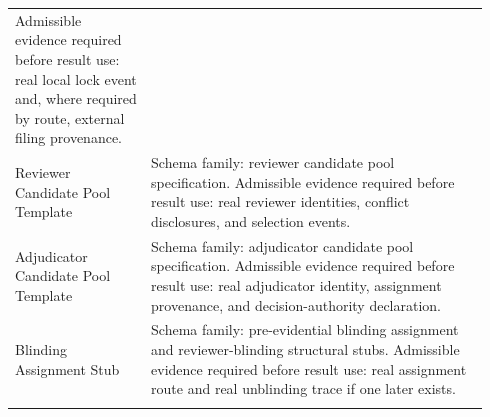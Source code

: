 \documentclass[11pt,a4paper]{article}
\begin{document}
\begin{longtable}{@{}>{\raggedright\arraybackslash}p{0.27\linewidth}p{0.67\linewidth}@{}}
Admissible evidence required before result use: real local lock event and, where
required by route, external filing provenance. \\ \addlinespace
Reviewer Candidate Pool Template & Schema family: reviewer candidate pool specification.\newline 
Admissible evidence required before result use: real reviewer identities,
conflict disclosures, and selection events. \\ \addlinespace
Adjudicator Candidate Pool Template & Schema family: adjudicator candidate pool specification.\newline 
Admissible evidence required before result use: real adjudicator identity,
assignment provenance, and decision-authority declaration. \\ \addlinespace
Blinding Assignment Stub & Schema family: pre-evidential blinding assignment and reviewer-blinding structural stubs.\newline 
Admissible evidence required before result use: real assignment route and real
unblinding trace if one later exists. \\ \addlinespace
\bottomrule\end{longtable}
\endgroup

\clearpage
\end{document}
